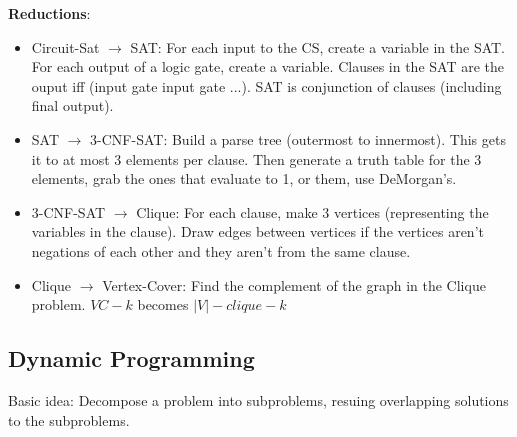 \documentclass[7pt]{article}
\begin{document}
\begin{multicols*}{4}
    {\bf Reductions}:
    \begin{itemize}
    \item Circuit-Sat $\rightarrow$ SAT: For each input to the CS, create a
      variable in the SAT.  For each output of a logic gate, create a
      variable.  Clauses in the SAT are the ouput iff (input gate
      input gate ...). SAT is conjunction of clauses (including final
      output).     
    \item SAT $\rightarrow$ 3-CNF-SAT: Build a parse tree (outermost
      to innermost).  This gets it to at most 3 elements per clause.
      Then generate a truth table for the 3 elements, grab the ones
      that evaluate to 1, or them, use DeMorgan's.  
    \item 3-CNF-SAT $\rightarrow$ Clique: For each clause, make 3
      vertices (representing the variables in the clause).  Draw edges
      between vertices if the vertices aren't negations of each other
      and they aren't from the same clause.
    \item Clique $\rightarrow$ Vertex-Cover: Find the complement of
      the graph in the Clique problem.  $VC-k$ becomes $|V| - clique-k$
    \end{itemize}


\subsection*{Dynamic Programming}
Basic idea: Decompose a problem into subproblems, resuing overlapping
solutions to the subproblems.

  \end{multicols*}
 
\end{document}
